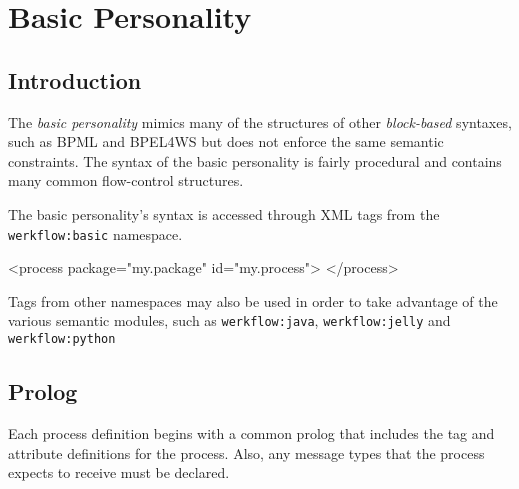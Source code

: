 
\chapter{Basic Personality}


\section{Introduction}

The \emph{basic personality} mimics many of the structures
of other \emph{block-based} syntaxes, such as BPML and BPEL4WS
but does not enforce the same semantic constraints.  The syntax of
the basic personality is fairly procedural and contains many common
flow-control structures.

The basic personality's syntax is accessed through XML tags from
the \verb|werkflow:basic| namespace.

\begin{codelisting}
<process 
         package="my.package"
         id="my.process">
</process>
\end{codelisting}

Tags from other namespaces may also be used in order to 
take advantage of the various semantic modules, such
as \verb|werkflow:java|, \verb|werkflow:jelly| and 
\verb|werkflow:python|


\section{Prolog}

Each process definition begins with a common prolog that includes
the  tag and attribute definitions for the process.
Also, any message types that the process expects to receive must
be declared.

\clearpage

\subsection{}

